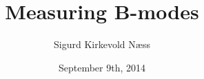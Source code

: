\documentclass{beamer}
\title{Measuring B-modes}
\author{Sigurd Kirkevold Næss}
\institute{Subdepartment of astrophysics, Oxford University}
\date{September 9th, 2014}
\begin{document}
\begin{frame}
	\titlepage
\end{frame}

\end{document}
